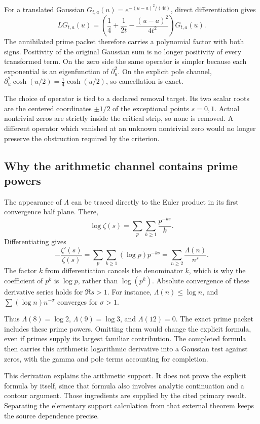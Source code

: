 For a translated Gaussian \(G_{t,a}(u)=e^{-(u-a)^2/(4t)}\), direct differentiation gives
\[
LG_{t,a}(u)=
\left(\frac14+\frac1{2t}-\frac{(u-a)^2}{4t^2}\right)
G_{t,a}(u).
\]
The annihilated prime packet therefore carries a polynomial factor with both signs. Positivity of the original Gaussian sum is no longer positivity of every transformed term. On the zero side the same operator is simpler because each exponential is an eigenfunction of \(\partial_u^2\). On the explicit pole channel, \(\partial_u^2\cosh(u/2)=\frac14\cosh(u/2)\), so cancellation is exact.

The choice of operator is tied to a declared removal target. Its two scalar roots are the centered coordinates \(\pm1/2\) of the exceptional points \(s=0,1\). Actual nontrivial zeros are strictly inside the critical strip, so none is removed. A different operator which vanished at an unknown nontrivial zero would no longer preserve the obstruction required by the criterion.

\subsection{Why the arithmetic channel contains prime powers}

The appearance of \(\Lambda\) can be traced directly to the Euler product in its first convergence half plane. There,
\[
\log\zeta(s)=\sum_p\sum_{k\ge1}\frac{p^{-ks}}k.
\]
Differentiating gives
\[
-\frac{\zeta'(s)}{\zeta(s)}
=\sum_p\sum_{k\ge1}(\log p)p^{-ks}
=\sum_{n\ge2}\frac{\Lambda(n)}{n^s}.
\]
The factor \(k\) from differentiation cancels the denominator \(k\), which is why the coefficient of \(p^k\) is \(\log p\), rather than \(\log(p^k)\). Absolute convergence of these derivative series holds for \(\Re s>1\). For instance, \(\Lambda(n)\le\log n\), and \(\sum(\log n)n^{-\sigma}\) converges for \(\sigma>1\).

Thus \(\Lambda(8)=\log2\), \(\Lambda(9)=\log3\), and \(\Lambda(12)=0\). The exact prime packet includes these prime powers. Omitting them would change the explicit formula, even if primes supply its largest familiar contribution. The completed formula then carries this arithmetic logarithmic derivative into a Gaussian test against zeros, with the gamma and pole terms accounting for completion.

This derivation explains the arithmetic support. It does not prove the explicit formula by itself, since that formula also involves analytic continuation and a contour argument. Those ingredients are supplied by the cited primary result. Separating the elementary support calculation from that external theorem keeps the source dependence precise.

